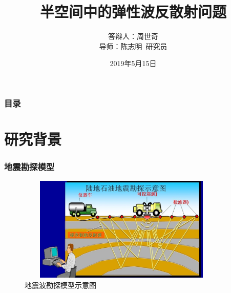 \documentclass[8pt]{beamer}
\begin{document}
\title[博士论文答辩]{半空间中的弹性波反散射问题}

\author[周世奇]{答辩人：周世奇 \\ \vspace{0.3cm} 导师：陈志明~研究员}
\date[2019年5月]{2019年5月15日}




\begin{frame}
  \titlepage
\end{frame}

\begin{frame}
  \frametitle{目录}
  \setcounter{tocdepth}{1}
  \tableofcontents%
\end{frame}

\section{研究背景}

\begin{frame}
\frametitle{地震勘探模型}
\begin{figure}

  \includegraphics[width=10cm,height=5cm]{./figure/seismic.png}
  \caption{地震波勘探模型示意图}
\end{figure}
\end{frame}
\end{document}
